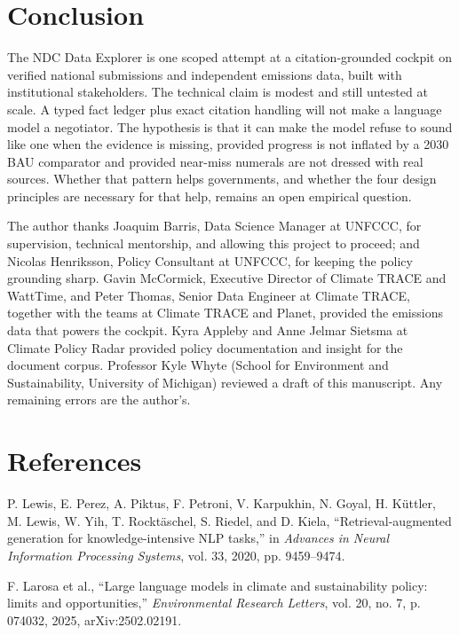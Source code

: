 \documentclass{article}
\begin{document}
\section{Conclusion}
\label{sec:conclusion}

The NDC Data Explorer is one scoped attempt at a citation-grounded cockpit on verified national submissions and independent emissions data, built with institutional stakeholders. The technical claim is modest and still untested at scale. A typed fact ledger plus exact citation handling will not make a language model a negotiator. The hypothesis is that it can make the model refuse to sound like one when the evidence is missing, provided progress is not inflated by a 2030 BAU comparator and provided near-miss numerals are not dressed with real sources. Whether that pattern helps governments, and whether the four design principles are necessary for that help, remains an open empirical question.

\begin{ack}
The author thanks Joaquim Barris, Data Science Manager at UNFCCC, for supervision, technical mentorship, and allowing this project to proceed; and Nicolas Henriksson, Policy Consultant at UNFCCC, for keeping the policy grounding sharp. Gavin McCormick, Executive Director of Climate TRACE and WattTime, and Peter Thomas, Senior Data Engineer at Climate TRACE, together with the teams at Climate TRACE and Planet, provided the emissions data that powers the cockpit. Kyra Appleby and Anne Jelmar Sietsma at Climate Policy Radar provided policy documentation and insight for the document corpus. Professor Kyle Whyte (School for Environment and Sustainability, University of Michigan) reviewed a draft of this manuscript. Any remaining errors are the author's.
\end{ack}

\section*{References}

\noindent [1] P. Lewis, E. Perez, A. Piktus, F. Petroni, V. Karpukhin, N. Goyal, H. K\"uttler, M. Lewis, W. Yih, T. Rockt\"aschel, S. Riedel, and D. Kiela, ``Retrieval-augmented generation for knowledge-intensive NLP tasks,'' in {\it Advances in Neural Information Processing Systems}, vol. 33, 2020, pp. 9459--9474.

\noindent [2] F. Larosa et al., ``Large language models in climate and sustainability policy: limits and opportunities,'' {\it Environmental Research Letters}, vol. 20, no. 7, p. 074032, 2025, arXiv:2502.02191.
\end{document}
